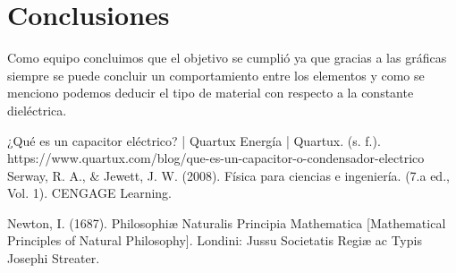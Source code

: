 \documentclass{article}
\begin{document}
\section{Conclusiones}\label{Conclusiones}				%
Como equipo concluimos que el objetivo se cumplió ya que gracias a las gráficas siempre se puede concluir 
un comportamiento entre los elementos y como se menciono podemos deducir el tipo de material con respecto 
a la constante dieléctrica.

\begin{thebibliography}{9}						%
	¿Qué es un capacitor eléctrico? | Quartux Energía | Quartux. (s. f.). https://www.quartux.com/blog/que-es-un-capacitor-o-condensador-electrico
	Serway, R. A., $\&$ Jewett, J. W. (2008). Física para ciencias e ingeniería. (7.a
ed., Vol. 1). CENGAGE Learning.

	Newton, I. (1687). Philosophiæ Naturalis Principia Mathematica [Mathematical Principles of Natural Philosophy]. Londini: Jussu Societatis Regiæ ac Typis Josephi Streater.

\end{thebibliography}
\end{document}
